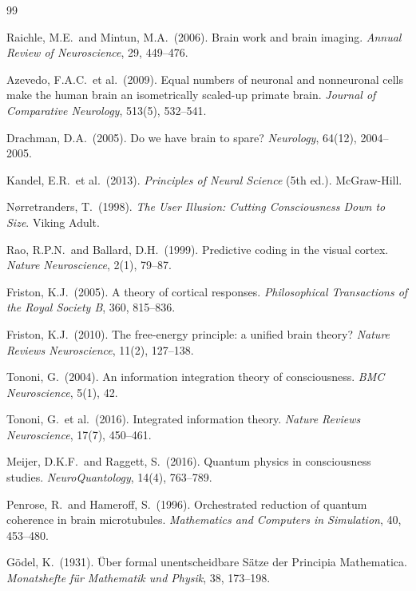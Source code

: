 \documentclass[12pt,a4paper]{article}
\theoremstyle{plain}
\theoremstyle{definition}
\theoremstyle{remark}
\begin{document}
\begin{thebibliography}{99}
\small

Raichle, M.E.\ and Mintun, M.A.\ (2006).
Brain work and brain imaging.
\textit{Annual Review of Neuroscience}, 29, 449--476.

Azevedo, F.A.C.\ et al.\ (2009).
Equal numbers of neuronal and nonneuronal cells make the human brain an isometrically scaled-up primate brain.
\textit{Journal of Comparative Neurology}, 513(5), 532--541.

Drachman, D.A.\ (2005).
Do we have brain to spare?
\textit{Neurology}, 64(12), 2004--2005.

Kandel, E.R.\ et al.\ (2013).
\textit{Principles of Neural Science} (5th ed.). McGraw-Hill.

Nørretranders, T.\ (1998).
\textit{The User Illusion: Cutting Consciousness Down to Size}.
Viking Adult.

Rao, R.P.N.\ and Ballard, D.H.\ (1999).
Predictive coding in the visual cortex.
\textit{Nature Neuroscience}, 2(1), 79--87.

Friston, K.J.\ (2005).
A theory of cortical responses.
\textit{Philosophical Transactions of the Royal Society B}, 360, 815--836.

Friston, K.J.\ (2010).
The free-energy principle: a unified brain theory?
\textit{Nature Reviews Neuroscience}, 11(2), 127--138.

Tononi, G.\ (2004).
An information integration theory of consciousness.
\textit{BMC Neuroscience}, 5(1), 42.

Tononi, G.\ et al.\ (2016).
Integrated information theory.
\textit{Nature Reviews Neuroscience}, 17(7), 450--461.

Meijer, D.K.F.\ and Raggett, S.\ (2016).
Quantum physics in consciousness studies.
\textit{NeuroQuantology}, 14(4), 763--789.

Penrose, R.\ and Hameroff, S.\ (1996).
Orchestrated reduction of quantum coherence in brain microtubules.
\textit{Mathematics and Computers in Simulation}, 40, 453--480.

Gödel, K.\ (1931).
Über formal unentscheidbare Sätze der Principia Mathematica.
\textit{Monatshefte für Mathematik und Physik}, 38, 173--198.


\end{thebibliography}
\end{document}
